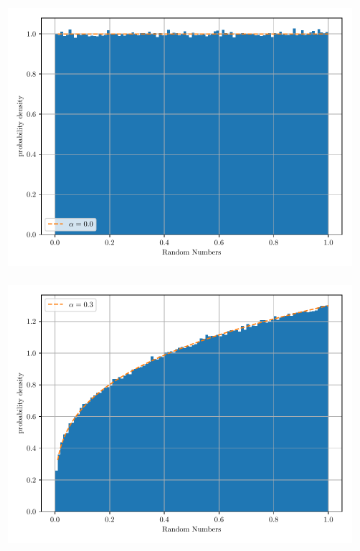 \documentclass[paper=a4, fontsize=11pt]{scrartcl} %
\numberwithin{equation}{section} %
\numberwithin{figure}{section} %
\numberwithin{table}{section} %
\begin{document}
\begin{figure}[!ht]
\begin{subfigure}[b]{0.495\textwidth}
		\includegraphics[width=\linewidth]{figure_3_c.pdf}
		\label{fig:non-uniform_1:c}
	\end{subfigure}
	\begin{subfigure}[b]{0.495\textwidth}
		\centering
		\includegraphics[width=\linewidth]{figure_3_d.pdf}
		\label{fig:non-uniform_1:d}
	\end{subfigure}
	\begin{subfigure}[b]{0.495\textwidth}
		\centering

\end{subfigure}
\end{figure}
\end{document}

